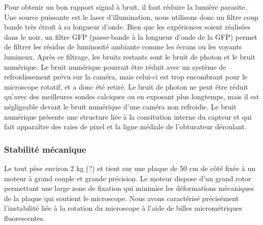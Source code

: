 

Pour obtenir un bon rapport signal à bruit, il faut réduire la lumière parasite. Une source puissante est le laser d'illumination, nous utilisons donc un filtre coup bande très étroit à sa longueur d'onde. Bien que les expériences soient réalisées dans le noir, un filtre GFP (passe-bande à la longueur d'onde de la GFP) permet de filtrer les résidus de luminosité ambiante comme les écrans ou les voyants lumineux. Après ce filtrage, les bruits restants sont le bruit de photon et le bruit numérique. Le bruit numérique pourrait être réduit avec un système de refroidissement prévu sur la caméra, mais celui-ci est trop encombrant pour le microscope rotatif, et a donc été retiré. Le bruit de photon ne peut être réduit qu'avec des meilleures sondes calciques ou en exposant plus longtemps, mais il est négligeable devant le bruit numérique d'une caméra non refroidie. Le bruit numérique présente une structure liée à la consitution interne du capteur et qui fait apparaître des raies de pixel et la ligne médiale de l'obturateur déroulant.



\subsubsection{Stabilité mécanique}

Le tout pèse environ 2 kg (?) et tient sur une plaque de 50 cm de côté fixée à un moteur à grand couple et grande précision. Le moteur dispose d'un grand rotor permettant une large zone de fixation qui minimise les déformations mécaniques de la plaque qui soutient le microscope. Nous avons caractérisé précisément l'instabilité liée à la rotation du microscope à l'aide de billes micrométriques fluorescentes.

